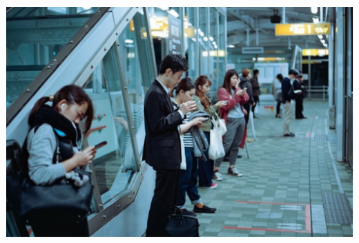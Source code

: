 \documentclass{article}
\begin{document}
\begin{multicols}{3}
\begin{center}
    \vspace{1cm}
    \includegraphics[width=35cm,height=25cm]{media/images/drustvene_mreze.png}
\end{center}


\end{multicols}
\end{document}
